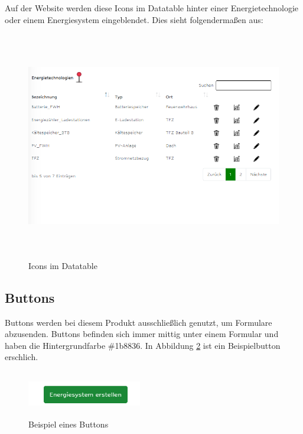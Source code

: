 Auf der Website werden diese Icons im Datatable hinter einer Energietechnologie oder einem Energiesystem eingeblendet. Dies sieht folgendermaßen aus:
\begin{figure}[h]
	\centering
	\includegraphics[height=10cm,width=15cm]{images/IconsImDatatable}
	\caption{Icons im Datatable}
	\label{fig: Icons im Datatable}
\end{figure}
\newpage

\subsection{Buttons}
Buttons werden bei diesem Produkt ausschließlich genutzt, um Formulare abzusenden. Buttons befinden sich immer mittig unter einem Formular und  haben die Hintergrundfarbe \#1b8836. In Abbildung \ref{fig: Beispiel eines Buttons} \space ist ein Beispielbutton erschlich. 
\begin{figure}[h]
	\centering
	\includegraphics[height=2cm,width=5cm]{images/BeispielButton}
	\caption{Beispiel eines Buttons}
	\label{fig: Beispiel eines Buttons}
\end{figure}
\newpage
